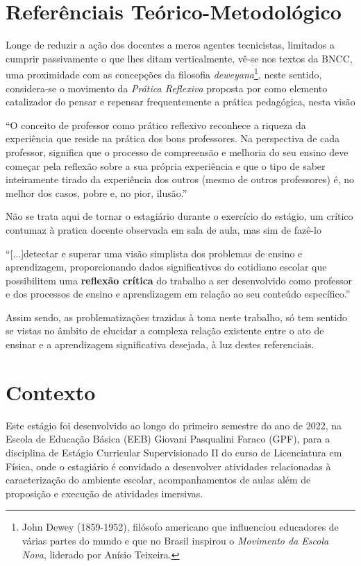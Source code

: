 \section{Referênciais Teórico-Metodológico}
Longe de reduzir a ação dos docentes a meros agentes tecnicistas, limitados a cumprir passivamente o que lhes ditam verticalmente, vê-se nos textos da BNCC, uma proximidade com as concepções da filosofia \emph{deweyana}\footnote{John Dewey (1859-1952), filósofo americano que influenciou educadores de várias partes do mundo e que no Brasil inspirou o \emph{Movimento da Escola Nova}, liderado por Anísio Teixeira.}, neste sentido, considera-se o movimento da \emph{Prática Reflexiva} proposta por \cite{ZEICHNER:1993} como elemento catalizador do pensar e repensar frequentemente a prática pedagógica, nesta visão
\begin{citacao}
``O conceito de professor como prático reflexivo reconhece a riqueza da experiência que reside na prática dos bons professores. Na perspectiva de cada professor, significa que o processo de compreensão e melhoria do seu ensino deve começar pela reflexão sobre a sua própria experiência e que o tipo de saber inteiramente tirado da experiência dos outros (mesmo de outros professores) é, no melhor dos casos, pobre e, no pior, ilusão.'' 
\end{citacao}
Não se trata aqui de tornar o estagiário durante o exercício do estágio, um crítico contumaz à pratica docente observada em sala de aula, mas sim de fazê-lo 
\begin{citacao}
``[...]detectar e superar uma visão simplista dos problemas de ensino e aprendizagem, proporcionando dados significativos do cotidiano escolar que possibilitem uma \textbf{reflexão crítica} do trabalho a ser desenvolvido como professor e dos processos de ensino e aprendizagem em relação ao seu conteúdo específico.'' \cite[p. 11, \textbf{grifos meus}]{CARVALHOAMP:2012b} 
\end{citacao}
Assim sendo, as problematizações trazidas à tona neste trabalho, só tem sentido se vistas no âmbito de elucidar a complexa relação existente entre o ato de ensinar e a aprendizagem significativa desejada, à luz destes referenciais.

\section{Contexto}
Este estágio foi desenvolvido ao longo do primeiro semestre do ano de 2022, na Escola de Educação Básica (EEB) Giovani Pasqualini Faraco (GPF), para a disciplina de Estágio Curricular Supervisionado II do curso de Licenciatura em Física, onde o estagiário é convidado a desenvolver atividades relacionadas à caracterização do ambiente escolar, acompanhamentos de aulas além de proposição e execução de atividades imersivas.
 
